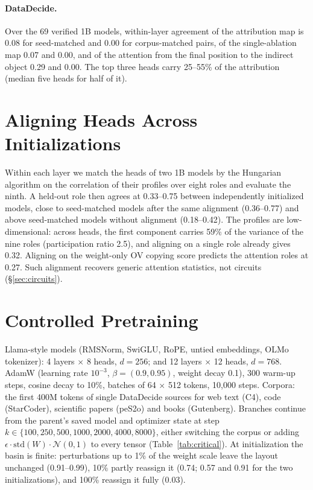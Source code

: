 \documentclass[11pt]{article}
\begin{document}
\paragraph{DataDecide.} Over the 69 verified 1B models, within-layer agreement of the attribution map is 0.08 for seed-matched and 0.00 for corpus-matched pairs, of the single-ablation map 0.07 and 0.00, and of the attention from the final position to the indirect object 0.29 and 0.00. The top three heads carry 25--55\% of the attribution (median five heads for half of it).

\section{Aligning Heads Across Initializations}
\label{app:alignment}
Within each layer we match the heads of two 1B models by the Hungarian algorithm on the correlation of their profiles over eight roles and evaluate the ninth. A held-out role then agrees at 0.33--0.75 between independently initialized models, close to seed-matched models after the same alignment (0.36--0.77) and above seed-matched models without alignment (0.18--0.42). The profiles are low-dimensional: across heads, the first component carries 59\% of the variance of the nine roles (participation ratio 2.5), and aligning on a single role already gives 0.32. Aligning on the weight-only OV copying score predicts the attention roles at 0.27. Such alignment recovers generic attention statistics, not circuits (\S\ref{sec:circuits}).

\section{Controlled Pretraining}
\label{app:controlled}
Llama-style models (RMSNorm, SwiGLU, RoPE, untied embeddings, OLMo tokenizer): 4 layers $\times$ 8 heads, $d = 256$; and 12 layers $\times$ 12 heads, $d = 768$.
AdamW (learning rate $10^{-3}$, $\beta = (0.9, 0.95)$, weight decay 0.1), 300 warm-up steps, cosine decay to 10\%, batches of 64 $\times$ 512 tokens, 10{,}000 steps.
Corpora: the first 400M tokens of single DataDecide sources for web text (C4), code (StarCoder), scientific papers (peS2o) and books (Gutenberg).
Branches continue from the parent's saved model and optimizer state at step $k \in \{100, 250, 500, 1000, 2000, 4000, 8000\}$, either switching the corpus or adding $\epsilon \cdot \mathrm{std}(W) \cdot \mathcal{N}(0, 1)$ to every tensor (Table~\ref{tab:critical}).
At initialization the basin is finite: perturbations up to 1\% of the weight scale leave the layout unchanged (0.91--0.99), 10\% partly reassign it (0.74; 0.57 and 0.91 for the two initializations), and 100\% reassign it fully (0.03).
\end{document}
